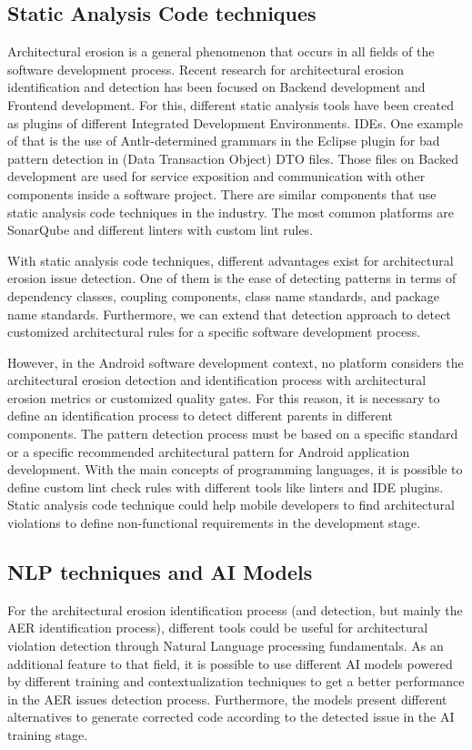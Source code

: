 \subsection{Static Analysis Code techniques}
Architectural erosion is a general phenomenon that occurs in all fields of the software development process. Recent research for architectural erosion identification and detection has been focused on Backend development and Frontend development. For this, different static analysis tools have been created as plugins of different Integrated Development Environments. IDEs. One example of that is the use of Antlr-determined grammars in the Eclipse plugin for bad pattern detection in (Data Transaction Object) DTO files. Those files on Backed development are used for service exposition and communication with other components inside a software project.
There are similar components that use static analysis code techniques in the industry. The most common platforms are SonarQube and different linters with custom lint rules.

With static analysis code techniques, different advantages exist for architectural erosion issue detection. One of them is the ease of detecting patterns in terms of dependency classes, coupling components, class name standards, and package name standards. Furthermore, we can extend that detection approach to detect customized architectural rules for a specific software development process. \cite{master-thesis-aer-backend}

However, in the Android software development context, no platform considers the architectural erosion detection and identification process with architectural erosion metrics or customized quality gates. For this reason, it is necessary to define an identification process to detect different parents in different components. The pattern detection process must be based on a specific standard or a specific recommended architectural pattern for Android application development. With the main concepts of programming languages, it is possible to define custom lint check rules with different tools like linters and IDE plugins. Static analysis code technique could help mobile developers to find architectural violations to define non-functional requirements in the development stage.


\subsection{NLP techniques and AI Models}
For the architectural erosion identification process (and detection, but mainly the AER identification process), different tools could be useful for architectural violation detection through Natural Language processing fundamentals. As an additional feature to that field, it is possible to use different AI models powered by different training and contextualization techniques to get a better performance in the AER issues detection process. Furthermore, the models present different alternatives to generate corrected code according to the detected issue in the AI training stage.

